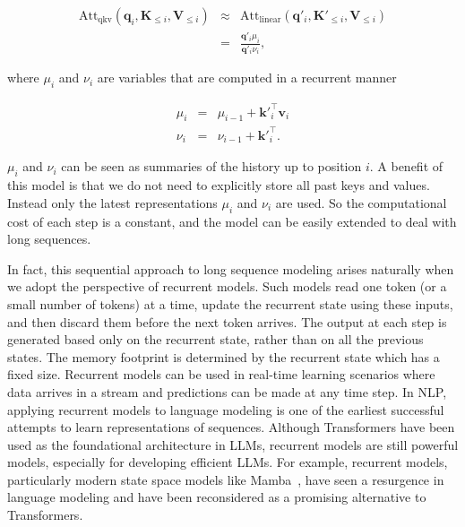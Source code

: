 \begin{eqnarray}
\mathrm{Att}_{\mathrm{qkv}}(\mathbf{q}_i,\mathbf{K}_{\le i},\mathbf{V}_{\le i}) & \approx & \mathrm{Att}_{\mathrm{linear}}(\mathbf{q}'_i,\mathbf{K}'_{\le i},\mathbf{V}_{\le i}) \nonumber \\
                                                                                & = & \frac{\mathbf{q}'_{i} \mu_i}{\mathbf{q}'_{i} \nu_i},
\end{eqnarray}

\noindent where $\mu_i$ and $\nu_i$ are variables that are computed in a recurrent manner

\begin{eqnarray}
\mu_i & = & \mu_{i-1} + {\mathbf{k}'}_{i}^\top \mathbf{v}_{i} \label{eq:linear-attention-mu-llm} \\
\nu_i & = & \nu_{i-1} + {\mathbf{k}'}_{i}^\top \label{eq:linear-attention-nu-llm}.
\end{eqnarray}

\noindent $\mu_i$ and $\nu_i$ can be seen as summaries of the history up to position $i$. A benefit of this model is that we do not need to explicitly store all past keys and values. Instead only the latest representations $\mu_i$ and $\nu_i$ are used. So the computational cost of each step is a constant, and the model can be easily extended to deal with long sequences.

In fact, this sequential approach to long sequence modeling arises naturally when we adopt the perspective of recurrent models. Such models read one token (or a small number of tokens) at a time, update the recurrent state using these inputs, and then discard them before the next token arrives. The output at each step is generated based only on the recurrent state, rather than on all the previous states. The memory footprint is determined by the recurrent state which has a fixed size. Recurrent models can be used in real-time learning scenarios where data arrives in a stream and predictions can be made at any time step. In NLP, applying recurrent models to language modeling is  one of the earliest successful attempts to learn representations of sequences. Although Transformers have been used as the foundational architecture in LLMs, recurrent models are still powerful models, especially for developing efficient LLMs. For example, recurrent models, particularly modern state space models like Mamba~\cite{gu-and-dao:2023mamba}, have seen a resurgence in language modeling and have been reconsidered as a promising alternative to Transformers.

